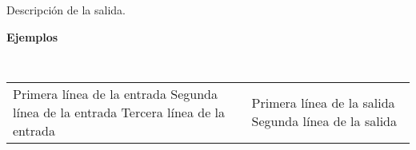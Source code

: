 \documentclass{article}
\newenvironment{SpanishTestCases}
{ 
	\vspace{-4mm}
	\begingroup
	\tt
	\renewcommand{\arraystretch}{1.5} %
	\begin{longtable}{| p{85mm} | p{85mm} |}
		\hline
		{\sf {\bfseries Entrada}} & {\sf {\bfseries Salida}} \\ \hline
		\endfirsthead
}
{
	\end{longtable}
	\endgroup
}
\newcommand{\printSubtitle}[1]{
	\vspace{1mm}
	\begin{flushleft} {\Large \sf \bfseries #1 \newline} \end{flushleft}
	\vspace{-4mm}
}
\newcommand{\addTest}[2]{
	#1 %
	&
	#2 %
	\\
	\hline
}
\begin{document}
Descripción de la salida.
\newline




\printSubtitle{Ejemplos}

\begin{SpanishTestCases}
    \addTest{
		Primera línea de la entrada \newline
		Segunda línea de la entrada \newline
		Tercera línea de la entrada
	}
	{
		Primera línea de la salida \newline
		Segunda línea de la salida
	}
\end{SpanishTestCases}
\end{document}
